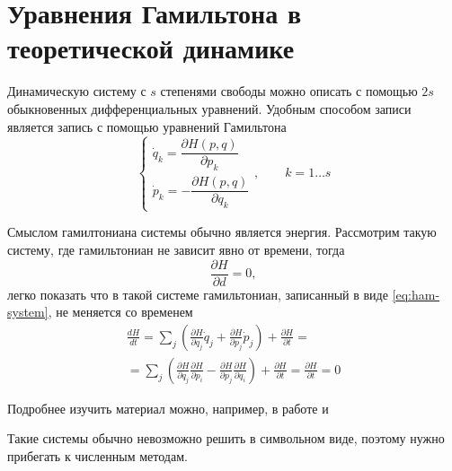 \section{Уравнения Гамильтона в теоретической динамике}
Динамическую систему с $s$ степенями свободы
можно описать с помощью $2s$ обыкновенных дифференциальных
уравнений. Удобным способом записи является запись с помощью уравнений
Гамильтона
\begin{equation}\label{eq:ham-system}
    \begin{cases}
        \dot q_k = \dfrac{\partial H(p, q)}{\partial p_k}\\
        \dot p_k = -\dfrac{\partial H(p, q)}{\partial q_k}
    \end{cases}, \qquad k = 1\dots s
\end{equation}

Смыслом гамилтониана системы обычно является энергия. Рассмотрим такую систему,
где гамильтониан не зависит явно от времени, тогда
\begin{equation}
    \frac{\partial H}{\partial d} = 0,
\end{equation}
легко показать что в такой системе
гамильтониан, записанный в виде \ref{eq:ham-system}, не меняется со временем
\begin{multline}
    \frac{d H}{dt} = \sum_j\left(\frac{\partial H}{\partial q_j}
    \dot q_j + \frac{\partial H}{\partial p_j}\dot p_j\right) + \frac{\partial
    H}{\partial t}
    =\\=
    \sum_j\left(\frac{\partial H}{\partial q_j} \frac{\partial H}{\partial p_i}
    - \frac{\partial H}{\partial p_j}\frac{\partial H}{\partial q_i} \right)
    + \frac{\partial H}{\partial t} = \frac{\partial H}{\partial t} = 0
\end{multline}

Подробнее изучить материал можно, например, в работе \cite[стр.~123]{1974} и
\cite[стр. 260]{1980}

Такие системы обычно невозможно решить в символьном виде, поэтому нужно
прибегать к численным методам.
